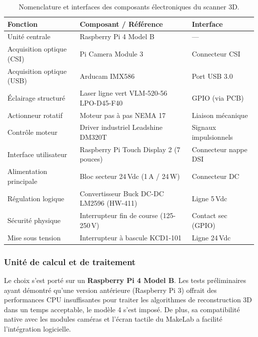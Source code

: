 \begin{table}[H]
    \centering
    \begin{tabular}{l p{5.5cm} l}
        \toprule
        \textbf{Fonction} & \textbf{Composant / Référence} & \textbf{Interface} \\
        \midrule
        Unité centrale & Raspberry Pi 4 Model B & --- \\
        Acquisition optique (CSI) & Pi Camera Module 3 & Connecteur CSI \\
        Acquisition optique (USB) & Arducam IMX586 & Port USB 3.0 \\
        Éclairage structuré & Laser ligne vert VLM-520-56 LPO-D45-F40 & GPIO (via PCB) \\
        Actionneur rotatif & Moteur pas à pas NEMA 17 & Liaison mécanique \\
        Contrôle moteur & Driver industriel Leadshine DM320T & Signaux impulsionnels \\
        Interface utilisateur & Raspberry Pi Touch Display 2 (7 pouces) & Connecteur nappe DSI \\
        Alimentation principale & Bloc secteur 24\,Vdc (1\,A / 24\,W) & Connecteur DC \\
        Régulation logique & Convertisseur Buck DC-DC LM2596 (HW-411) & Ligne 5\,Vdc \\
        Sécurité physique & Interrupteur fin de course (125-250\,V) & Contact sec (GPIO) \\
        Mise sous tension & Interrupteur à bascule KCD1-101 & Ligne 24\,Vdc \\
        \bottomrule
    \end{tabular}
    \caption{Nomenclature et interfaces des composants électroniques du scanner 3D.}
    \label{tab:bom_finale}
\end{table}

\subsubsection{Unité de calcul et de traitement}
Le choix s'est porté sur un \textbf{Raspberry Pi 4 Model B}. 
Les tests préliminaires ayant démontré qu'une version antérieure (Raspberry Pi 3) offrait des performances CPU insuffisantes pour traiter les algorithmes de reconstruction 3D dans un temps acceptable, le modèle 4 s'est imposé. 
De plus, sa compatibilité native avec les modules caméras et l'écran tactile du MakeLab a facilité l'intégration logicielle.

